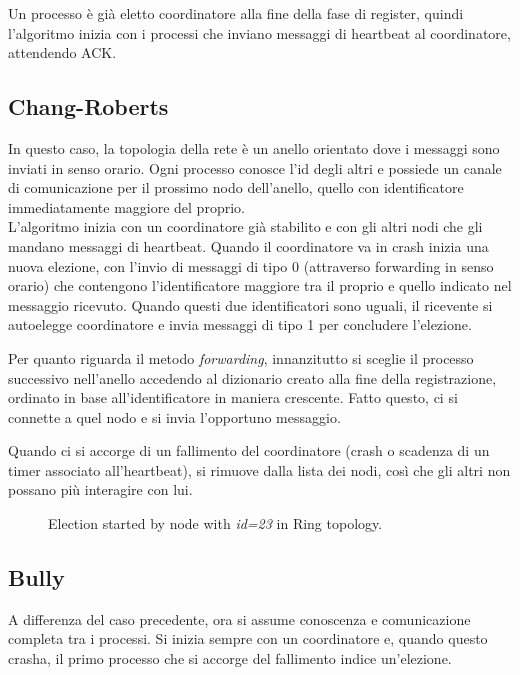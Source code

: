 \documentclass[conference]{IEEEtran}
\begin{document}
Un processo è già eletto coordinatore alla fine della fase di register, quindi l'algoritmo inizia con i processi che inviano messaggi di heartbeat al coordinatore, attendendo ACK.


\subsection{Chang-Roberts}\label{ring}

In questo caso, la topologia della rete è un anello orientato dove i messaggi sono inviati in senso orario.
Ogni processo conosce l'id degli altri e possiede un canale di comunicazione per il prossimo nodo dell'anello, quello con identificatore immediatamente maggiore del proprio.\\

L'algoritmo inizia con un coordinatore già stabilito e con gli altri nodi che gli mandano messaggi di heartbeat.
Quando il coordinatore va in crash inizia una nuova elezione, con l'invio di messaggi di tipo 0 (attraverso forwarding in senso orario) che contengono l'identificatore maggiore tra il proprio e quello indicato nel messaggio ricevuto. Quando questi due identificatori sono uguali, il ricevente si autoelegge coordinatore e invia messaggi di tipo 1 per concludere l'elezione.

Per quanto riguarda il metodo \textit{forwarding}, innanzitutto si sceglie il processo successivo nell'anello accedendo al dizionario creato alla fine della registrazione, ordinato in base all'identificatore in maniera crescente.
Fatto questo, ci si connette a quel nodo e si invia l'opportuno messaggio.

Quando ci si accorge di un fallimento del coordinatore (crash o scadenza di un timer associato all'heartbeat), si rimuove dalla lista dei nodi, così che gli altri non possano più interagire con lui.

\begin{figure}[htbp]
  \centering
  
  \caption{Election started by node with \textit{id=23} in Ring topology.}
\end{figure}


\subsection{Bully}\label{bully}

A differenza del caso precedente, ora si assume conoscenza e comunicazione completa tra i processi.
Si inizia sempre con un coordinatore e, quando questo crasha, il primo processo che si accorge del fallimento indice un'elezione.
\end{document}
